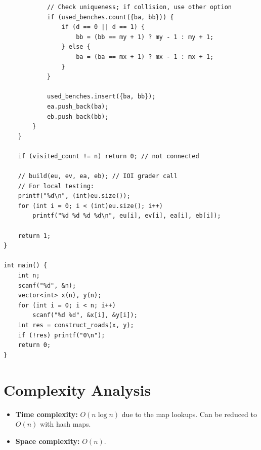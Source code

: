 \documentclass[11pt,a4paper]{article}
\begin{document}
\begin{lstlisting}
            // Check uniqueness; if collision, use other option
            if (used_benches.count({ba, bb})) {
                if (d == 0 || d == 1) {
                    bb = (bb == my + 1) ? my - 1 : my + 1;
                } else {
                    ba = (ba == mx + 1) ? mx - 1 : mx + 1;
                }
            }

            used_benches.insert({ba, bb});
            ea.push_back(ba);
            eb.push_back(bb);
        }
    }

    if (visited_count != n) return 0; // not connected

    // build(eu, ev, ea, eb); // IOI grader call
    // For local testing:
    printf("%d\n", (int)eu.size());
    for (int i = 0; i < (int)eu.size(); i++)
        printf("%d %d %d %d\n", eu[i], ev[i], ea[i], eb[i]);

    return 1;
}

int main() {
    int n;
    scanf("%d", &n);
    vector<int> x(n), y(n);
    for (int i = 0; i < n; i++)
        scanf("%d %d", &x[i], &y[i]);
    int res = construct_roads(x, y);
    if (!res) printf("0\n");
    return 0;
}
\end{lstlisting}

\section{Complexity Analysis}
\begin{itemize}
  \item \textbf{Time complexity:} $O(n \log n)$ due to the map lookups. Can be reduced to $O(n)$ with hash maps.
  \item \textbf{Space complexity:} $O(n)$.
\end{itemize}
\end{document}
